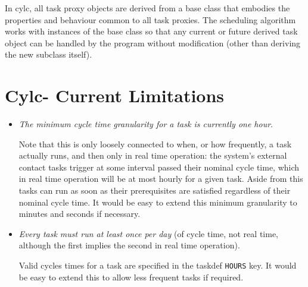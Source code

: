 \documentclass[11pt,a4paper]{article}
\begin{document}
In cylc, all task proxy objects are derived from a base class that 
embodies the properties and behaviour common to all task proxies. 
The scheduling algorithm works with instances of the base class so that
any current or future derived task object can be handled by the program
without modification (other than deriving the new subclass itself).


%
%


\section{Cylc- Current Limitations}

\begin{itemize}

        \item {\em The minimum cycle time granularity for a task is currently one hour}.

Note that this is only loosely connected to when, or how frequently, a
task actually runs, and then only in real time operation: the system's
external contact tasks trigger at some interval passed their nominal
cycle time, which in real time operation will be at most hourly for a
given task. Aside from this tasks can run as soon as their prerequisites
are satisfied regardless of their nominal cycle time. It would be easy
to extend this minimum granularity to minutes and seconds if necessary.  

    \item {\em Every task must run at least once per day} (of cycle
        time, not real time, although the first implies the second in
        real time operation). 

Valid cycles times for a task are specified in the taskdef
\lstinline=HOURS= key.  It would be easy to extend this to allow less
frequent tasks if required. 

\end{itemize}
\end{document}
